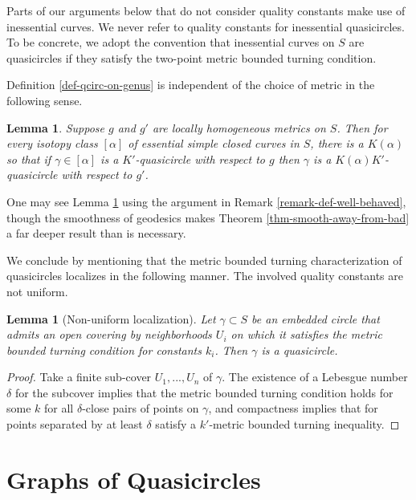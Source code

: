 \documentclass[12pt,a4paper]{amsart}
\theoremstyle{definition}
\theoremstyle{plain}
\newtheorem{lemma}[theorem]{Lemma}
\numberwithin{equation}{section}
\begin{document}
Parts of our arguments below that do not consider quality constants make use of inessential curves.
We never refer to quality constants for inessential quasicircles.
To be concrete, we adopt the convention that inessential curves on $S$ are quasicircles if they satisfy the two-point metric bounded turning condition.

Definition \ref{def-qcirc-on-genus} is independent of the choice of metric in the following sense. 
\begin{lemma}\label{lemma-qc-independence}
    Suppose $g$ and $g'$ are locally homogeneous metrics on $S$. Then for every isotopy class $[\alpha]$ of essential simple closed curves in $S$, there is a $K(\alpha)$ so that if $\gamma \in [\alpha]$ is a $K'$-quasicircle with respect to $g$ then $\gamma$ is a $K(\alpha)K'$-quasicircle with respect to $g'$.
\end{lemma}

One may see Lemma \ref{lemma-qc-independence} using the argument in Remark \ref{remark-def-well-behaved}, though the smoothness of geodesics makes Theorem \ref{thm-smooth-away-from-bad} a far deeper result than is necessary.

We conclude by mentioning that the metric bounded turning characterization of quasicircles localizes in the following manner.
The involved quality constants are not uniform.

\begin{lemma}[Non-uniform localization]\label{lemma-bt-localizes}
    Let $\gamma \subset S$ be an embedded circle that admits an open covering by neighborhoods $U_i$ on which it satisfies the metric bounded turning condition for constants $k_i$.
    Then $\gamma$ is a quasicircle.
\end{lemma}

\begin{proof}
    Take a finite sub-cover $U_1, ..., U_n$ of $\gamma$.
    The existence of a Lebesgue number $\delta$ for the subcover implies that the metric bounded turning condition holds for some $k$ for all $\delta$-close pairs of points on $\gamma$, and compactness implies that for points separated by at least $\delta$ satisfy a $k'$-metric bounded turning inequality.
\end{proof}

\section{Graphs of Quasicircles}\label{s-main-defs}
\end{document}

